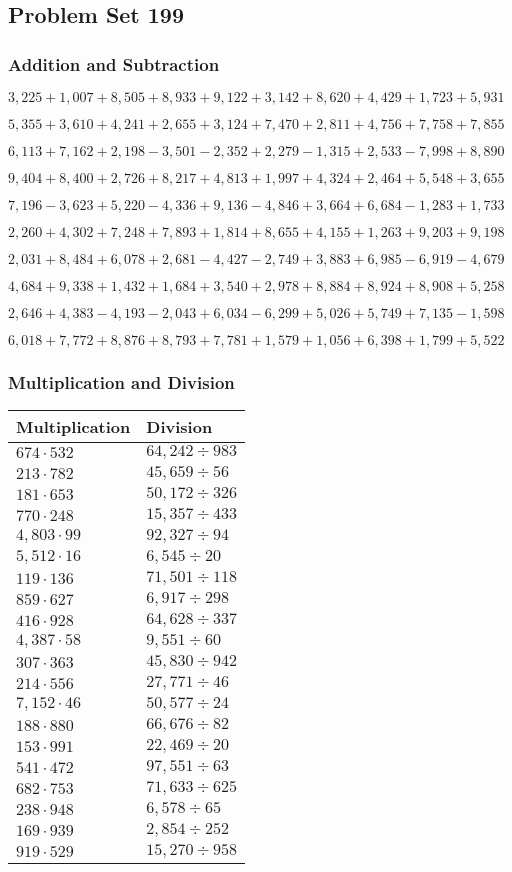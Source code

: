 \hypertarget{problem-set-199}{%
\subsection{Problem Set 199}\label{problem-set-199}}

\hypertarget{addition-and-subtraction}{%
\subsubsection{Addition and
Subtraction}\label{addition-and-subtraction}}

\(3,225+1,007+8,505+8,933+9,122+3,142+8,620+4,429+1,723+5,931\)

\(5,355+3,610+4,241+2,655+3,124+7,470+2,811+4,756+7,758+7,855\)

\(6,113+7,162+2,198-3,501-2,352+2,279-1,315+2,533-7,998+8,890\)

\(9,404+8,400+2,726+8,217+4,813+1,997+4,324+2,464+5,548+3,655\)

\(7,196-3,623+5,220-4,336+9,136-4,846+3,664+6,684-1,283+1,733\)

\(2,260+4,302+7,248+7,893+1,814+8,655+4,155+1,263+9,203+9,198\)

\(2,031+8,484+6,078+2,681-4,427-2,749+3,883+6,985-6,919-4,679\)

\(4,684+9,338+1,432+1,684+3,540+2,978+8,884+8,924+8,908+5,258\)

\(2,646+4,383-4,193-2,043+6,034-6,299+5,026+5,749+7,135-1,598\)

\(6,018+7,772+8,876+8,793+7,781+1,579+1,056+6,398+1,799+5,522\)

\hypertarget{multiplication-and-division}{%
\subsubsection{Multiplication and
Division}\label{multiplication-and-division}}

\begin{longtable}[]{@{}ll@{}}
\toprule
Multiplication & Division\tabularnewline
\midrule
\endhead
\(674\cdot532\) & \(64,242÷983\)\tabularnewline
\(213\cdot782\) & \(45,659÷56\)\tabularnewline
\(181\cdot653\) & \(50,172÷326\)\tabularnewline
\(770\cdot248\) & \(15,357÷433\)\tabularnewline
\(4,803\cdot99\) & \(92,327÷94\)\tabularnewline
\(5,512\cdot16\) & \(6,545÷20\)\tabularnewline
\(119\cdot136\) & \(71,501÷118\)\tabularnewline
\(859\cdot627\) & \(6,917÷298\)\tabularnewline
\(416\cdot928\) & \(64,628÷337\)\tabularnewline
\(4,387\cdot58\) & \(9,551÷60\)\tabularnewline
\(307\cdot363\) & \(45,830÷942\)\tabularnewline
\(214\cdot556\) & \(27,771÷46\)\tabularnewline
\(7,152\cdot46\) & \(50,577÷24\)\tabularnewline
\(188\cdot880\) & \(66,676÷82\)\tabularnewline
\(153\cdot991\) & \(22,469÷20\)\tabularnewline
\(541\cdot472\) & \(97,551÷63\)\tabularnewline
\(682\cdot753\) & \(71,633÷625\)\tabularnewline
\(238\cdot948\) & \(6,578÷65\)\tabularnewline
\(169\cdot939\) & \(2,854÷252\)\tabularnewline
\(919\cdot529\) & \(15,270÷958\)\tabularnewline
\bottomrule
\end{longtable}
